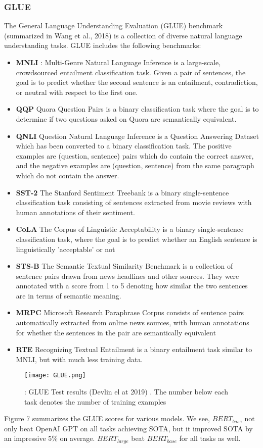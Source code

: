 \documentclass[12pt,a4paper]{article}
\numberwithin{equation}{section}
\begin{document}
\subsubsection{GLUE}
The General Language Understanding Evaluation (GLUE) benchmark (summarized in Wang et al., 2018) is a collection of diverse natural language understanding tasks. 
GLUE includes the following benchmarks:
\begin{itemize}
    \item \textbf{MNLI} : Multi-Genre Natural Language Inference
is a large-scale, crowdsourced entailment classification task. Given a pair of
sentences, the goal is to predict whether the second sentence is an entailment, contradiction, or neutral with respect to the first one. 

\item \textbf{QQP }Quora Question Pairs is a binary classification task where the goal is to determine if two
questions asked on Quora are semantically equivalent.
\item \textbf{QNLI  } Question Natural Language Inference is
a  Question Answering Dataset  which has been
converted to a binary classification task. The positive examples are (question, sentence) pairs which do contain the correct
answer, and the negative examples are (question,
sentence) from the same paragraph which do not
contain the answer.
\item \textbf{SST-2   }The Stanford Sentiment Treebank is a
binary single-sentence classification task consisting of sentences extracted from movie reviews with human annotations of their sentiment.
\item \textbf{CoLA   } The Corpus of Linguistic Acceptability is
a binary single-sentence classification task, where
the goal is to predict whether an English sentence
is linguistically 'acceptable' or not
\item \textbf{STS-B   } The Semantic Textual Similarity Benchmark is a collection of sentence pairs drawn from
news headlines and other sources. They were annotated with a score from 1
to 5 denoting how similar the two sentences are in
terms of semantic meaning.
\item \textbf{MRPC   } Microsoft Research Paraphrase Corpus
consists of sentence pairs automatically extracted
from online news sources, with human annotations for whether the sentences in the pair are semantically equivalent
\item \textbf{RTE } Recognizing Textual Entailment is a binary entailment task similar to MNLI, but with
much less training data.
\end{itemize}
\begin{figure}
    \centering
    \texttt{[image: GLUE.png]}
    \caption{: GLUE Test results (Devlin el at 2019) . The number below each task denotes the number of training examples}
   \label{fig:my_label}
\end{figure}
Figure 7 summarizes the GLUE scores for various models. We see, $BERT_{base}$ not only beat OpenAI GPT on all tasks achieving SOTA, but it improved SOTA by an impressive 5\% on average. $BERT_{large}$ beat $BERT_{base}$ for all tasks as well.
\end{document}
